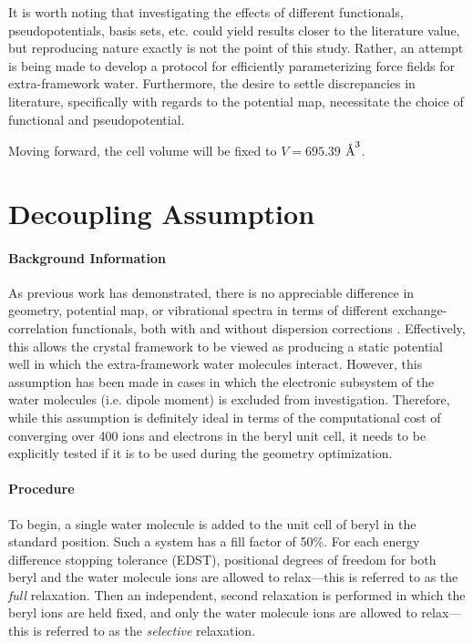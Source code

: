         It is worth noting that investigating the effects of different functionals, pseudopotentials, basis sets, etc. could yield results closer to the literature value, but reproducing nature exactly is not the point of this study. Rather, an attempt is being made to develop a protocol for efficiently parameterizing force fields for extra-framework water. Furthermore, the desire to settle discrepancies in literature, specifically with regards to the potential map, necessitate the choice of functional and pseudopotential.
        
        Moving forward, the cell volume will be fixed to $V=695.39$ $\text{\normalfont\AA}^3$.
    \section{Decoupling Assumption}
    \label{sec:da}
        \paragraph{Background Information} As previous work has demonstrated, there is no appreciable difference in geometry, potential map, or vibrational spectra in terms of different exchange-correlation functionals, both with and without dispersion corrections \cite{vibr_states}. Effectively, this allows the crystal framework to be viewed as producing a static potential well in which the extra-framework water molecules interact. However, this assumption has been made in cases in which the electronic subsystem of the water molecules (i.e. dipole moment) is excluded from investigation. Therefore, while this assumption is definitely ideal in terms of the computational cost of converging over 400 ions and electrons in the beryl unit cell, it needs to be explicitly tested if it is to be used during the geometry optimization. 
            
        \paragraph{Procedure} To begin, a single water molecule is added to the unit cell of beryl in the standard position. Such a system has a fill factor of 50\%. For each energy difference stopping tolerance (EDST), positional degrees of freedom for both beryl and the water molecule ions are allowed to relax---this is referred to as the \textit{full} relaxation. Then an independent, second relaxation is performed in which the beryl ions are held fixed, and only the water molecule ions are allowed to relax---this is referred to as the \textit{selective} relaxation.
            
